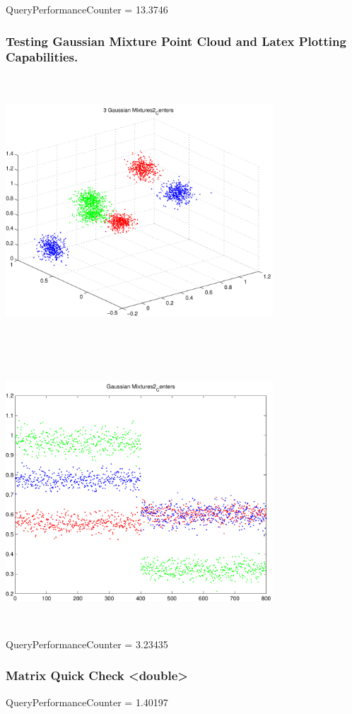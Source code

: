\documentclass[9pt]{article}
\theoremstyle{plain}
\theoremstyle{definition}
\theoremstyle{remark}
\numberwithin{equation}{section}
\begin{document}
QueryPerformanceCounter  =  13.3746
\subsubsection{Testing Gaussian Mixture Point Cloud and Latex Plotting Capabilities.}
\includegraphics[width=10.0cm,height=10.0cm]{GaussianMixture_Dim_3_Centers2.pdf}

\includegraphics[width=10.0cm,height=10.0cm]{GaussianMixture_Dim_1_Centers2.pdf}

QueryPerformanceCounter  =  3.23435
\subsubsection{Matrix Quick Check <double>}
QueryPerformanceCounter  =  1.40197
\end{document}
